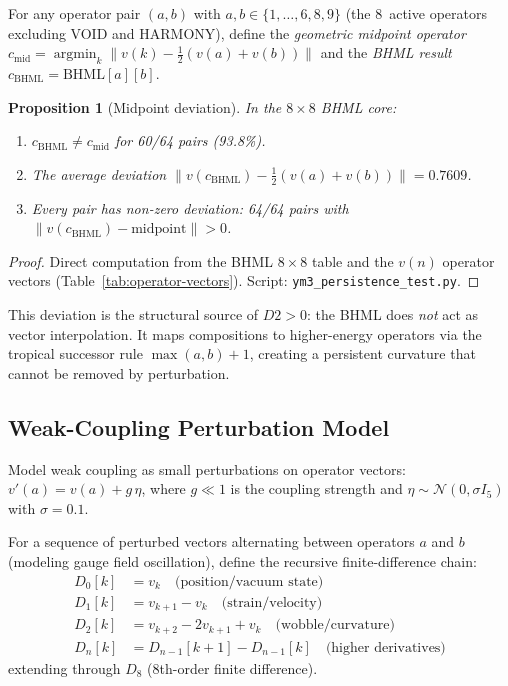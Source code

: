 \documentclass[11pt]{article}
\newtheorem{proposition}[theorem]{Proposition}
\begin{document}
For any operator pair $(a,b)$ with $a,b \in \{1,\ldots,6,8,9\}$
(the 8~active operators excluding VOID and HARMONY), define the
\emph{geometric midpoint operator}
$c_{\mathrm{mid}} = \operatorname{argmin}_k \|v(k) - \tfrac{1}{2}(v(a) + v(b))\|$
and the \emph{BHML result} $c_{\mathrm{BHML}} = \mathrm{BHML}[a][b]$.

\begin{proposition}[Midpoint deviation]\label{prop:midpoint-dev}
In the $8 \times 8$ BHML core:
\begin{enumerate}
  \item $c_{\mathrm{BHML}} \neq c_{\mathrm{mid}}$ for 60/64 pairs (93.8\%).
  \item The average deviation
    $\|v(c_{\mathrm{BHML}}) - \tfrac{1}{2}(v(a)+v(b))\| = 0.7609$.
  \item Every pair has non-zero deviation: 64/64 pairs with
    $\|v(c_{\mathrm{BHML}}) - \mathrm{midpoint}\| > 0$.
\end{enumerate}
\end{proposition}

\begin{proof}
Direct computation from the BHML $8 \times 8$ table and the
$v(n)$ operator vectors (Table~\ref{tab:operator-vectors}).
Script: \texttt{ym3\_persistence\_test.py}.
\end{proof}

This deviation is the structural source of $D2 > 0$: the BHML does
\emph{not} act as vector interpolation.  It maps compositions to
higher-energy operators via the tropical successor rule
$\max(a,b)+1$, creating a persistent curvature that cannot be
removed by perturbation.

\subsection{Weak-Coupling Perturbation Model}
\label{ssec:ym3-perturbation}

Model weak coupling as small perturbations on operator vectors:
$v'(a) = v(a) + g\,\eta$, where $g \ll 1$ is the coupling strength
and $\eta \sim \mathcal{N}(0, \sigma I_5)$ with $\sigma = 0.1$.

For a sequence of perturbed vectors alternating between operators
$a$ and $b$ (modeling gauge field oscillation), define the recursive
finite-difference chain:
\begin{align}
  D_0[k] &= v_k \quad \text{(position/vacuum state)} \\
  D_1[k] &= v_{k+1} - v_k \quad \text{(strain/velocity)} \\
  D_2[k] &= v_{k+2} - 2v_{k+1} + v_k \quad \text{(wobble/curvature)} \\
  D_n[k] &= D_{n-1}[k+1] - D_{n-1}[k] \quad \text{(higher derivatives)}
\end{align}
extending through $D_8$ (8th-order finite difference).
\end{document}
